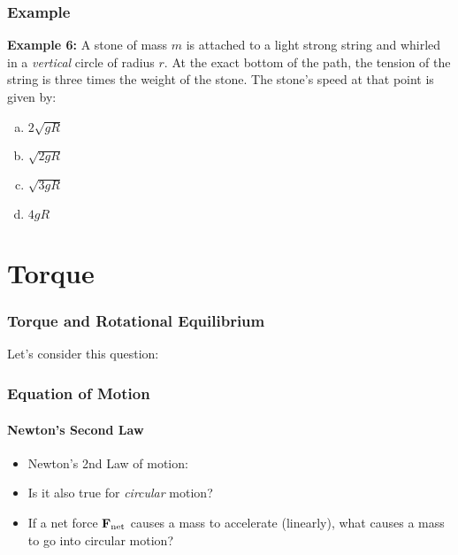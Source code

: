 \documentclass[12pt,compress,aspectratio=169]{beamer}
\newcommand{\mb}[1]{\ensuremath\mathbf{#1}}
\begin{document}
\begin{frame}
  \frametitle{Example}
  \textbf{Example 6:} A stone of mass $m$ is attached to a light strong string
  and whirled in a \emph{vertical} circle of radius $r$. At the exact bottom of
  the path, the tension of the string is three times the weight of the stone.
  The stone's speed at that point is given by:
  \begin{enumerate}[(a)]
  \item $2\sqrt{gR}$
  \item $\sqrt{2gR}$
  \item $\sqrt{3gR}$
  \item $4gR$
  \end{enumerate}
\end{frame}


\section{Torque}


\begin{frame}
  \frametitle{Torque and Rotational Equilibrium}
  Let's consider this question:

  \begin{center}
  \end{center}
\end{frame}

\begin{frame}
  \frametitle{Equation of Motion}
  \framesubtitle{Newton's Second Law}
  \begin{itemize}
  \item Newton's 2nd Law of motion:
    
    \vspace{-0.3in}{\LARGE
    \begin{displaymath}
      \boxed{\mb{F}_\mathrm{net}=m\mb{a}}
    \end{displaymath}
  }
  \item Is it also true for \emph{circular} motion?
  \item If a net force $\mb{F}_\mathrm{net}$ causes a mass to accelerate
    (linearly), what causes a mass to go into circular motion?
  \end{itemize}

\end{frame}
\end{document}
